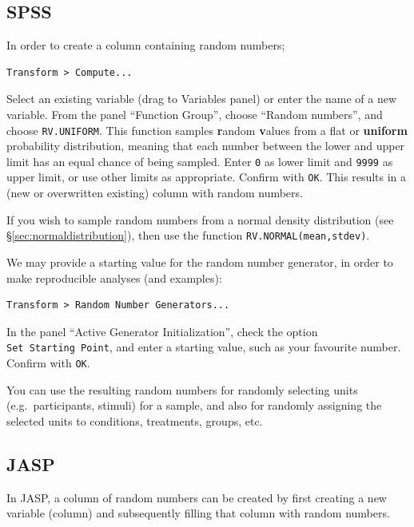\documentclass[
]{book}
\begin{document}
\subsection{SPSS}\label{spss}

In order to create a column containing random numbers;

\begin{verbatim}
Transform > Compute...
\end{verbatim}

Select an existing variable (drag to Variables panel) or enter the name of a new variable.
From the panel ``Function Group'', choose ``Random numbers'', and choose \texttt{RV.UNIFORM}.
This function samples \textbf{r}andom \textbf{v}alues from a flat or \textbf{uniform} probability distribution, meaning that each number between the lower and upper limit has an equal chance of being sampled.
Enter \texttt{0} as lower limit and \texttt{9999} as upper limit, or use other limits as appropriate.
Confirm with \texttt{OK}.
This results in a (new or overwritten existing) column with random numbers.

If you wish to sample random numbers from a normal density distribution (see §\ref{sec:normaldistribution}), then use the function \texttt{RV.NORMAL(mean,stdev)}.

We may provide a starting value for the random number generator, in order to make reproducible analyses (and examples):

\begin{verbatim}
Transform > Random Number Generators...
\end{verbatim}

In the panel ``Active Generator Initialization'', check the option \texttt{Set\ Starting\ Point}, and enter a starting value, such as your favourite number. Confirm with \texttt{OK}.

You can use the resulting random numbers for randomly selecting units (e.g.~participants, stimuli) for a sample, and also for randomly assigning the selected units to conditions, treatments, groups, etc.

\subsection{JASP}\label{jasp}

In JASP, a column of random numbers can be created by first creating a new variable (column) and subsequently filling that column with random numbers.
\end{document}

